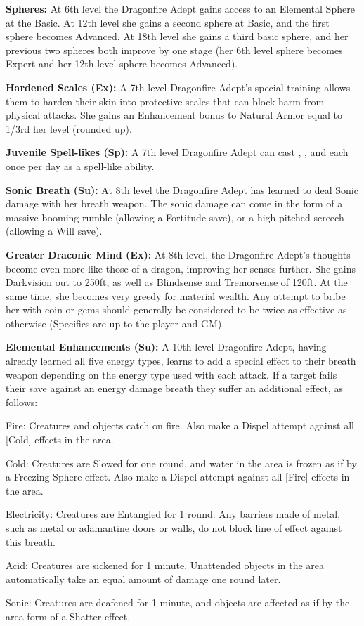 \textbf{Spheres:} At 6th level the Dragonfire Adept gains access to an Elemental Sphere at the Basic. At 12th level she gains a second sphere at Basic, and the first sphere becomes Advanced. At 18th level she gains a third basic sphere, and her previous two spheres both improve by one stage (her 6th level sphere becomes Expert and her 12th level sphere becomes Advanced).

\textbf{Hardened Scales (Ex):} A 7th level Dragonfire Adept's special training allows them to harden their skin into protective scales that can block harm from physical attacks. She gains an Enhancement bonus to Natural Armor equal to 1/3rd her level (rounded up).

\textbf{Juvenile Spell-likes (Sp):} A 7th level Dragonfire Adept can cast , , and  each once per day as a spell-like ability.

\textbf{Sonic Breath (Su):} At 8th level the Dragonfire Adept has learned to deal Sonic damage with her breath weapon. The sonic damage can come in the form of a massive booming rumble (allowing a Fortitude save), or a high pitched screech (allowing a Will save).

\textbf{Greater Draconic Mind (Ex):} At 8th level, the Dragonfire Adept's thoughts become even more like those of a dragon, improving her senses further. She gains Darkvision out to 250ft, as well as Blindsense and Tremorsense of 120ft. At the same time, she becomes very greedy for material wealth. Any attempt to bribe her with coin or gems should generally be considered to be twice as effective as otherwise (Specifics are up to the player and GM).

\textbf{Elemental Enhancements (Su):} A 10th level Dragonfire Adept, having already learned all five energy types, learns to add a special effect to their breath weapon depending on the energy type used with each attack. If a target fails their save against an energy damage breath they suffer an additional effect, as follows:

\begin{itemize*}
\item Fire: Creatures and objects catch on fire. Also make a Dispel attempt against all [Cold] effects in the area.
\item Cold: Creatures are Slowed for one round, and water in the area is frozen as if by a Freezing Sphere effect. Also make a Dispel attempt against all [Fire] effects in the area.
\item Electricity: Creatures are Entangled for 1 round. Any barriers made of metal, such as metal or adamantine doors or walls, do not block line of effect against this breath.
\item Acid: Creatures are sickened for 1 minute. Unattended objects in the area automatically take an equal amount of damage one round later.
\item Sonic: Creatures are deafened for 1 minute, and objects are affected as if by the area form of a Shatter effect.
\end{itemize*}

